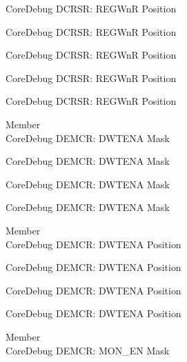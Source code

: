 \begin{DoxyRefList}
\label{deprecated__deprecated000927}%
%
Core\+Debug DCRSR\+: REGWnR Position 

\label{deprecated__deprecated000986}%
%
Core\+Debug DCRSR\+: REGWnR Position 

\label{deprecated__deprecated001062}%
%
Core\+Debug DCRSR\+: REGWnR Position 

\label{deprecated__deprecated001151}%
%
Core\+Debug DCRSR\+: REGWnR Position 

\label{deprecated__deprecated001253}%
%
Core\+Debug DCRSR\+: REGWnR Position  
\item[Member \doxylink{group___c_m_s_i_s___core_debug_ga2fcc0b8f174e85379d38e1cb74b8c627}{Core\+Debug\+\_\+\+DEMCR\+\_\+\+DWTENA\+\_\+\+Msk} ]\hfill \\
\label{deprecated__deprecated000134}%
%
Core\+Debug DEMCR\+: DWTENA Mask 

\label{deprecated__deprecated000273}%
%
Core\+Debug DEMCR\+: DWTENA Mask 

\label{deprecated__deprecated000793}%
%
Core\+Debug DEMCR\+: DWTENA Mask 

\label{deprecated__deprecated000932}%
%
Core\+Debug DEMCR\+: DWTENA Mask  
\item[Member \doxylink{group___c_m_s_i_s___core_debug_ga0cde79c4e741e1eed0513c1f985baeb9}{Core\+Debug\+\_\+\+DEMCR\+\_\+\+DWTENA\+\_\+\+Pos} ]\hfill \\
\label{deprecated__deprecated000133}%
%
Core\+Debug DEMCR\+: DWTENA Position 

\label{deprecated__deprecated000272}%
%
Core\+Debug DEMCR\+: DWTENA Position 

\label{deprecated__deprecated000792}%
%
Core\+Debug DEMCR\+: DWTENA Position 

\label{deprecated__deprecated000931}%
%
Core\+Debug DEMCR\+: DWTENA Position  
\item[Member \doxylink{group___c_m_s_i_s___core_debug_gac2b46b9b65bf8d23027f255fc9641977}{Core\+Debug\+\_\+\+DEMCR\+\_\+\+MON\+\_\+\+EN\+\_\+\+Msk} ]\hfill \\
\label{deprecated__deprecated000054}%
%
Core\+Debug DEMCR\+: MON\+\_\+\+EN Mask 


\end{DoxyRefList}

